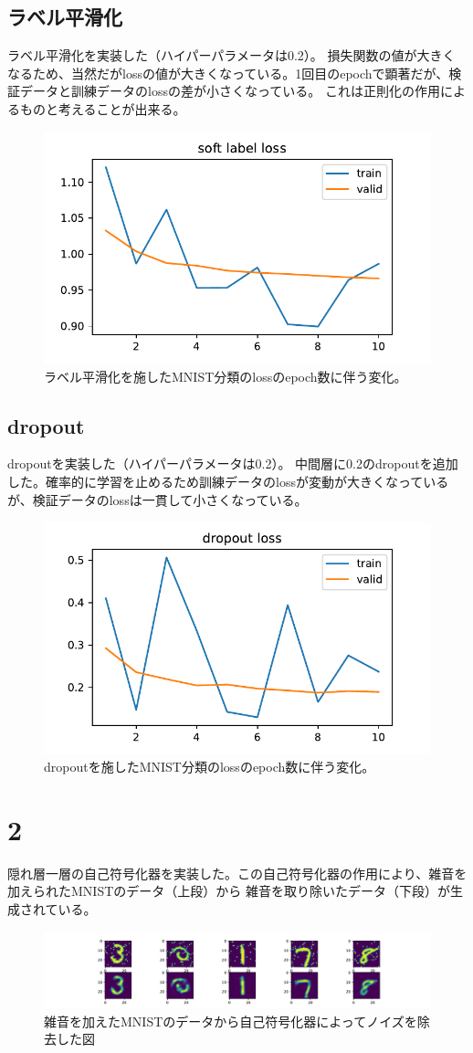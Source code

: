 \documentclass[a4paper,11pt]{jsarticle}
\begin{document}
  \subsection*{ラベル平滑化}
  ラベル平滑化を実装した（ハイパーパラメータは0.2）。
  損失関数の値が大きくなるため、当然だがlossの値が大きくなっている。1回目のepochで顕著だが、検証データと訓練データのlossの差が小さくなっている。
  これは正則化の作用によるものと考えることが出来る。
  \begin{figure}[H]
    \centering
    \includegraphics[width=0.6\linewidth]{softlabel.pdf}
    \caption{ラベル平滑化を施したMNIST分類のlossのepoch数に伴う変化。}
  \end{figure}

  \subsection*{dropout}
  dropoutを実装した（ハイパーパラメータは0.2）。
  中間層に0.2のdropoutを追加した。確率的に学習を止めるため訓練データのlossが変動が大きくなっているが、検証データのlossは一貫して小さくなっている。
  \begin{figure}[H]
    \centering
    \includegraphics[width=0.6\linewidth]{dropout.pdf}
    \caption{dropoutを施したMNIST分類のlossのepoch数に伴う変化。}
  \end{figure}



  \section*{2}
  隠れ層一層の自己符号化器を実装した。この自己符号化器の作用により、雑音を加えられたMNISTのデータ（上段）から
  雑音を取り除いたデータ（下段）が生成されている。
  \begin{figure}[H]
    \centering
    \includegraphics[width=\linewidth]{../autoencoder.pdf}
    \caption{雑音を加えたMNISTのデータから自己符号化器によってノイズを除去した図}
  \end{figure}
\end{document}
